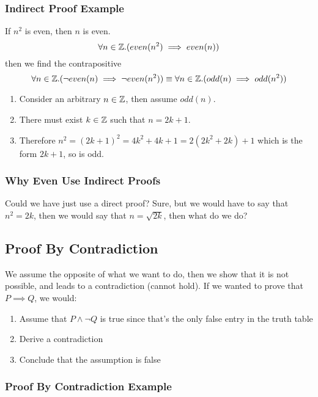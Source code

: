 \subsubsection{Indirect Proof Example}\label{ssub:indirect_proof_example}

If \(n^2\) is even, then \(n\) is even.
\[
    \forall n \in \mathbb{Z} . (even(n^2) \implies even(n))
\]
then we find the contrapositive
\[
    \forall n \in \mathbb{Z} . (\neg even(n) \implies \neg even(n^2)) \equiv \forall n \in \mathbb{Z} . (odd(n) \implies odd(n^2))
\]
\begin{enumerate}
    \item Consider an arbitrary \(n\in \mathbb{Z}\), then assume \(odd(n)\).
    \item There must exist \(k\in \mathbb{Z}\) such that \(n = 2k + 1\).
    \item Therefore \(n^2 = (2k+1)^2 = 4k^2+4k+1 = 2(2k^2 + 2k) + 1\) which is the form \(2k + 1\), so is odd.
\end{enumerate}

\subsubsection{Why Even Use Indirect Proofs}\label{ssub:why_even_use_indirect_proofs}

Could we have just use a direct proof?
Sure, but we would have to say that \(n^2 = 2k\), then we would say that \(n=\sqrt{2k}\), then what do we do?

\subsection{Proof By Contradiction}\label{sub:proof_by_contradiction}

We assume the opposite of what we want to do, then we show that it is not possible, and leads to a contradiction (cannot hold).
If we wanted to prove that \(P \implies Q\), we would:
\begin{enumerate}
    \item Assume that \(P \land \neg Q\) is true since that's the only false entry in the truth table
    \item Derive a contradiction
    \item Conclude that the assumption is false
\end{enumerate}

\subsubsection{Proof By Contradiction Example}\label{ssub:proof_by_contradiction_example}

